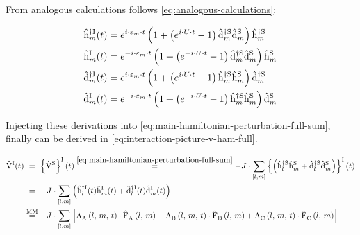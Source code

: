 From analogous calculations follows \autoref{eq:analogous-calculations}:

\begin{equation}
    \label{eq:analogous-calculations}
    \begin{split}
        \hopOfT[\interactionPicture]{m}{\dagger}  &= e^{i \cdot \epsl[m]\cdot  t}\left(1 + \left(e^{i  \cdot U  \cdot  t}-1\right) \dop[\schroedingerPicture]{m}{\dagger}\dop[\schroedingerPicture]{m}{}\right)  \hop[\schroedingerPicture]{m}{\dagger}\\
        \hopOfT[\interactionPicture]{m}{}  &= e^{-i \cdot \epsl[m]\cdot  t}\left(1 + \left(e^{-i  \cdot U  \cdot  t}-1\right) \dop[\schroedingerPicture]{m}{\dagger}\dop[\schroedingerPicture]{m}{}\right)  \hop[\schroedingerPicture]{m}{}\\
        \dopOfT[\interactionPicture]{m}{\dagger}  &= e^{i \cdot \epsl[m]\cdot  t}\left(1 + \left(e^{i  \cdot U  \cdot  t}-1\right) \hop[\schroedingerPicture]{m}{\dagger}\hop[\schroedingerPicture]{m}{}\right)  \dop[\schroedingerPicture]{m}{\dagger}\\
        \dopOfT[\interactionPicture]{m}{}  &= e^{-i \cdot \epsl[m]\cdot  t}\left(1 + \left(e^{-i  \cdot U  \cdot  t}-1\right) \hop[\schroedingerPicture]{m}{\dagger}\hop[\schroedingerPicture]{m}{}\right)  \dop[\schroedingerPicture]{m}{}\\
    \end{split}
\end{equation}

Injecting these derivations into \autoref{eq:main-hamiltonian-perturbation-full-sum}, finally \VhamiltonianOfT[\interactionPicture] can be derived in \autoref{eq:interaction-picture-v-ham-full}.

\begin{equation}
    \label{eq:interaction-picture-v-ham-full}
    \begin{split}
        \VhamiltonianOfT[\interactionPicture] &
        \stackrel{\phantom{\text{MM}}}{=}
        \interactionTimeEvolution{\Vhamiltonian[\schroedingerPicture]} \stackrel{\ref{eq:main-hamiltonian-perturbation-full-sum}}{=}
        - J \cdot \fullneighborsum{l}{m}  \interactionTimeEvolution{
              \left(\hop[\schroedingerPicture]{l}{\dagger}\hop[\schroedingerPicture]{m}{} + \dop[\schroedingerPicture]{l}{\dagger}\dop[\schroedingerPicture]{m}{} \right)
        } \\
        &\stackrel{\phantom{\text{MM}}}{=}
        -J \cdot \fullneighborsum{l}{m}\left(\hopOfT[\interactionPicture]{l}{\dagger}\hopOfT[\interactionPicture]{m}{} + \dopOfT[\interactionPicture]{l}{\dagger}\dopOfT[\interactionPicture]{m}{} \right)\\
        &\stackrel{\text{MM}}{=}
        -J \cdot \fullneighborsum{l}{m} \left[
            \VhamiltonianAnalyticalPart{A}{l}{m}{t} \cdot \VhamiltonianOperatorPart{A}{l}{m} + 
            \VhamiltonianAnalyticalPart{B}{l}{m}{t} \cdot \VhamiltonianOperatorPart{B}{l}{m} + 
            \VhamiltonianAnalyticalPart{C}{l}{m}{t} \cdot \VhamiltonianOperatorPart{C}{l}{m} 
        \right]
    \end{split}
\end{equation}

